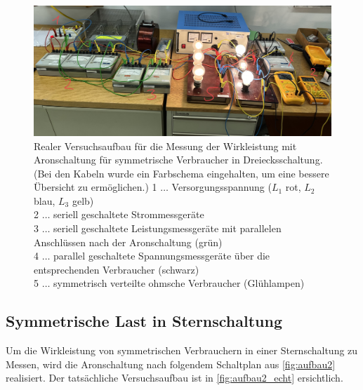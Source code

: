 \documentclass[12pt,english,ngerman]{scrartcl}
\begin{document}
\begin{figure}[H]
	\begin{center}
		\includegraphics[width = \textwidth]{./figures/aufbau1_echt.png}
	\end{center}
	\caption[Realer Versuchsaufbau für die Messung der Wirkleistung mit Aronschaltung für symmetrische
	Verbraucher in Dreiecksschaltung]
	{Realer Versuchsaufbau für die Messung der Wirkleistung mit Aronschaltung für symmetrische
	Verbraucher in Dreiecksschaltung. (Bei den Kabeln wurde ein Farbschema eingehalten, um eine bessere Übersicht zu ermöglichen.) 
	1 \(\dots\) Versorgungsspannung ($L_1$ rot, $L_2$ blau, $L_3$ gelb) \\
	2 \(\dots\) seriell geschaltete Strommessgeräte  \\
	3 \(\dots\) seriell geschaltete Leistungsmessgeräte mit parallelen Anschlüssen nach der Aronschaltung (grün)\\
	4 \(\dots\) parallel geschaltete Spannungsmessgeräte über die entsprechenden Verbraucher (schwarz)\\
	5 \(\dots\) symmetrisch verteilte ohmsche Verbraucher (Glühlampen)}
	\label{fig:aufbau1_echt}
\end{figure}

\subsection{Symmetrische Last in Sternschaltung}

Um die Wirkleistung von symmetrischen Verbrauchern in einer Sternschaltung zu Messen, wird die Aronschaltung
nach folgendem Schaltplan aus \autoref{fig:aufbau2} realisiert. 
Der tatsächliche Versuchsaufbau ist in \autoref{fig:aufbau2_echt} ersichtlich.
\end{document}
